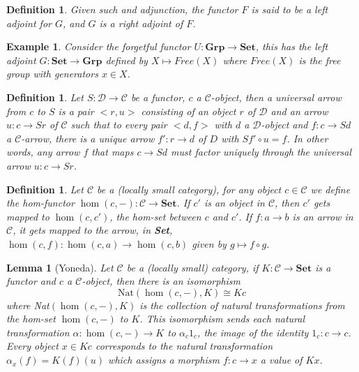 \documentclass[12pt,a4paper]{article}
\newtheorem{lemma}[theorem]{Lemma}
\newtheorem{example}[theorem]{Example}
\newtheorem{definition}[theorem]{Definition}
\newcommand\CC{\mathcal{C}}
\newcommand\DD{\mathcal{D}}
\begin{document}
\begin{definition}
    Given such and adjunction, the functor $F$ is said to be a \textit{left adjoint} for $G$, and $G$ is a \textit{right adjoint} of $F$.
\end{definition}

\begin{example}
    Consider the forgetful functor $U:\textbf{Grp}\to\textbf{Set}$, this has the left adjoint $G:\textbf{Set}\to\textbf{Grp}$ defined by $X\mapsto Free(X)$ where $Free(X)$ is the free group with generators $x\in X$. 
\end{example}

\begin{definition}
    Let $S:\DD\to\CC$ be a functor, $c$ a $\CC$-object, then a \textit{universal arrow} from $c$ to $S$ is a pair $<r,u>$ consisting of an object $r$ of $\DD$ and an arrow $u:c\to Sr$ of $\CC$
    such that to every pair $<d,f>$ with $d$ a $\DD$-object and $f:c\to Sd$ a $\CC$-arrow, there is a unique arrow $f':r\to d$ of $D$ with $Sf'\circ u=f$. 
    In other words, any arrow $f$ that maps $c\to Sd$ must factor uniquely through the universal arrow $u:c\to Sr$.
    \begin{center}
    \end{center}
\end{definition}


\begin{definition}
    Let $\CC$ be a (locally small category), for any object $c\in\CC$ we define the hom-functor $\hom(c,-):\CC\to\textbf{Set}$.
    If $c'$ is an object in $\CC$, then $c'$ gets mapped to $\hom(c,c')$, the hom-set between $c$ and $c'$.
    If $f:a\to b$ is an arrow in $\CC$, it gets mapped to the arrow, in \textbf{Set}, $\hom(c,f):\hom(c,a)\to\hom(c,b)$ given by $g\mapsto f\circ g$.
\end{definition}

\begin{lemma}[Yoneda]
    Let $\CC$ be a (locally small) category, if $K:\CC\to\textbf{Set}$ is a functor and $c$ a $\CC$-object, then there is an isomorphism
    \[
        \text{Nat}(\hom(c,-),K)\cong Kc
    \]
    where Nat$(\hom(c,-),K)$ is the collection of natural transformations from the hom-set $\hom(c,-)$ to $K$.
    This isomorphism sends each natural transformation $\alpha:\hom(c,-)\to K$ to $\alpha_c 1_c$, the image of the identity $1_c:c\to c$.
    Every object $x\in Kc$ corresponds to the natural transformation $\alpha_x(f)=K(f)(u)$ which assigns a morphism $f:c\to x$ a value of $Kx$.
\end{lemma}
\end{document}
